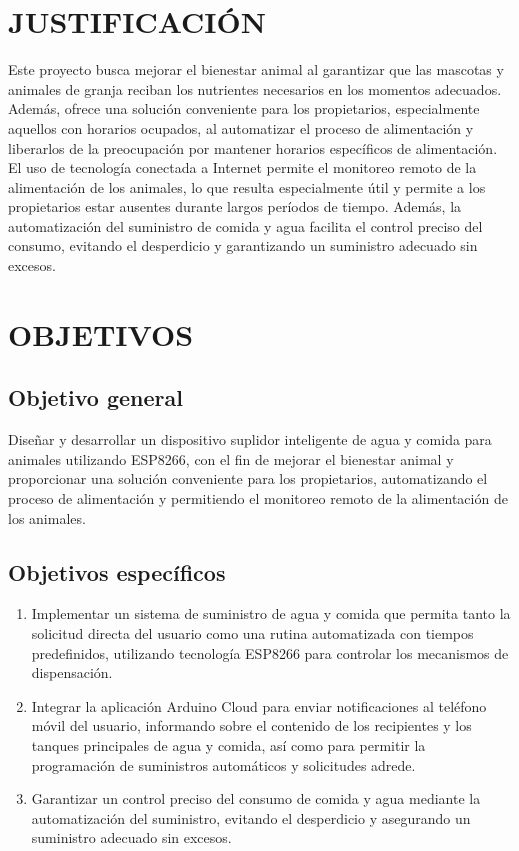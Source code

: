 \section{JUSTIFICACIÓN}
Este proyecto busca mejorar el bienestar animal al garantizar que las mascotas y animales de granja reciban los nutrientes necesarios en los momentos adecuados. Además, ofrece una solución conveniente para los propietarios, especialmente aquellos con horarios ocupados, al automatizar el proceso de alimentación y liberarlos de la preocupación por mantener horarios específicos de alimentación. El uso de tecnología conectada a Internet permite el monitoreo remoto de la alimentación de los animales, lo que resulta especialmente útil y permite a los propietarios estar ausentes durante largos períodos de tiempo. Además, la automatización del suministro de comida y agua facilita el control preciso del consumo, evitando el desperdicio y garantizando un suministro adecuado sin excesos. 

\section{OBJETIVOS}

\subsection{Objetivo general}
Diseñar y desarrollar un dispositivo suplidor inteligente de agua y comida para animales utilizando ESP8266, con el fin de mejorar el bienestar animal y proporcionar una solución conveniente para los propietarios, automatizando el proceso de alimentación y permitiendo el monitoreo remoto de la alimentación de los animales.

\subsection{Objetivos específicos}

\begin{enumerate}
    \item Implementar un sistema de suministro de agua y comida que permita tanto la solicitud directa del usuario como una rutina automatizada con tiempos predefinidos, utilizando tecnología ESP8266 para controlar los mecanismos de dispensación.
    \item Integrar la aplicación Arduino Cloud para enviar notificaciones al teléfono móvil del usuario, informando sobre el contenido de los recipientes y los tanques principales de agua y comida, así como para permitir la programación de suministros automáticos y solicitudes adrede.
    \item Garantizar un control preciso del consumo de comida y agua mediante la automatización del suministro, evitando el desperdicio y asegurando un suministro adecuado sin excesos. 
\end{enumerate}
 